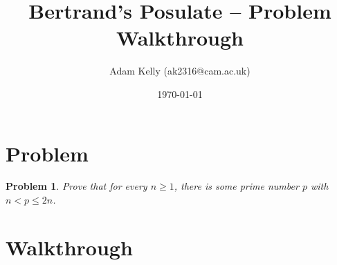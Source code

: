 \documentclass[11pt, a4paper, reqno]{amsart}
\title{Bertrand's Posulate -- Problem Walkthrough}
\author{Adam Kelly (ak2316@cam.ac.uk)}
\date{\today}
\newtheorem*{problem}{Problem}
\theoremstyle{definition}
\begin{document}
\vspace*{-1cm}
\maketitle

\section*{Problem}

\begin{problem}
Prove that for every $n \geq 1$, there is some prime number $p$ with $n < p \leq 2n$.
\end{problem}


\section*{Walkthrough}
\end{document}
